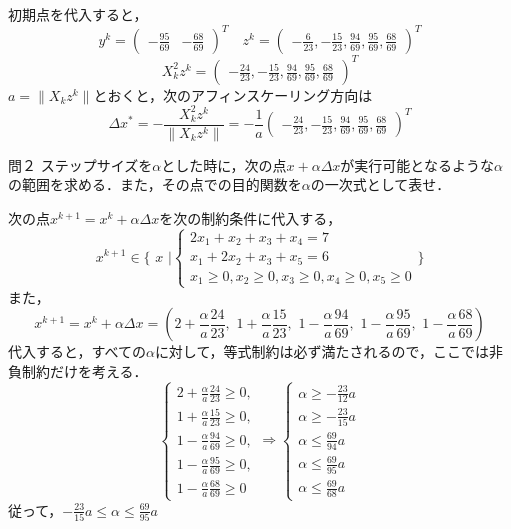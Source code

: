 \documentclass[a4paper,11pt]{jsarticle}
\numberwithin{theorem}{section}  %
\numberwithin{equation}{section} %
\begin{document}
初期点を代入すると，
\[
y^k=\begin{pmatrix}
-\frac{95}{69}&
-\frac{68}{69}
\end{pmatrix}^T
\,\,\,\,\,\,
z^k=\begin{pmatrix}
-\frac{6}{23},
-\frac{15}{23},
\frac{94}{69},
\frac{95}{69},
\frac{68}{69}
\end{pmatrix}^T
\]
\[
X_k^2z^k = \begin{pmatrix}
-\frac{24}{23},
-\frac{15}{23},
\frac{94}{69},
\frac{95}{69},
\frac{68}{69}
\end{pmatrix}^T
\]
$a=\|X_kz^k\|$とおくと，次のアフィンスケーリング方向は
\[
\Delta x^* = -\frac{ X_k^2z^k}{\| X_kz^k \|} = -\frac{1}{a}\begin{pmatrix}
-\frac{24}{23},
-\frac{15}{23},
\frac{94}{69},
\frac{95}{69},
\frac{68}{69}
\end{pmatrix}^T
\]
\begin{itembox}[l]{問２}
ステップサイズを$\alpha$とした時に，次の点$x+\alpha \Delta x$が実行可能となるような$\alpha$の範囲を求める．また，その点での目的関数を$\alpha$の一次式として表せ．
\end{itembox}
次の点$x^{k+1} = x^k +\alpha \Delta x$を次の制約条件に代入する，
\[
x^{k+1} \in \Bigr\{ \,\,x\,\, \Bigr| \begin{cases}
2x_1 + x_2 + x_3 +x_4 =7\\
x_1 +2x_2 +x_3 +x_5 = 6\\
x_1 \ge 0, x_2 \ge 0, x_3 \ge 0, x_4 \ge 0, x_5 \ge 0
\end{cases} \Bigr\}
\]
また，
\[
x^{k+1} = x^k +\alpha \Delta x = (
2 + \frac{\alpha}{a}\frac{24}{23},\,\,
1 + \frac{\alpha}{a}\frac{15}{23},\,\,
1 - \frac{\alpha}{a}\frac{94}{69},\,\,
1 - \frac{\alpha}{a}\frac{95}{69},\,\,
1 - \frac{\alpha}{a}\frac{68}{69}
)
\]
代入すると，すべての$\alpha$に対して，等式制約は必ず満たされるので，ここでは非負制約だけを考える．
\[
\begin{cases}
2 + \frac{\alpha}{a}\frac{24}{23} \ge 0,\\
1 + \frac{\alpha}{a}\frac{15}{23} \ge 0,\\
1 - \frac{\alpha}{a}\frac{94}{69} \ge 0,\\
1 - \frac{\alpha}{a}\frac{95}{69} \ge 0,\\
1 - \frac{\alpha}{a}\frac{68}{69} \ge 0
\end{cases}
\Rightarrow
\begin{cases}
\alpha \ge -\frac{23}{12}a\\
\alpha \ge -\frac{23}{15}a\\
\alpha \le \frac{69}{94}a\\
\alpha \le \frac{69}{95}a\\
\alpha \le \frac{69}{68}a 
\end{cases}
\]
従って，$-\frac{23}{15}a \le \alpha \le \frac{69}{95}a$\\
\end{document}
